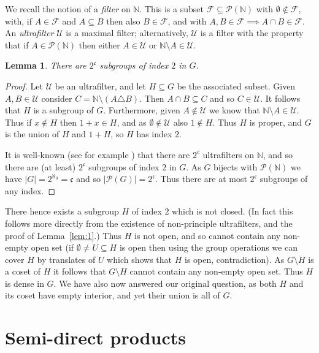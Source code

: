 \documentclass[twoside,a4paper,12pt]{article}
\theoremstyle{plain}
\newtheorem{lemma}[proposition]{Lemma}
\theoremstyle{definition}
\newcommand{\mc}{\mathcal}
\newcommand{\mf}{\mathfrak}
\begin{document}
We recall the notion of a \emph{filter} on $\mathbb N$.  This is a subset $\mc F\subseteq
\mc P(\mathbb N)$ with $\emptyset\not\in\mc F$, with, if $A\in\mc F$ and $A\subseteq B$ then also
$B\in\mc F$, and with $A,B\in\mc F\implies A\cap B\in\mc F$.  An \emph{ultrafilter} $\mc U$
is a maximal filter; alternatively, $\mc U$ is a filter with the property that if
$A\in\mc P(\mathbb N)$ then either $A\in\mc U$ or $\mathbb N\setminus A\in\mc U$.

\begin{lemma}
There are $2^{\mf{c}}$ subgroups of index $2$ in $G$.
\end{lemma}
\begin{proof}
Let $\mc U$ be an ultrafilter, and let $H\subseteq G$ be the associated subset.  Given $A,B\in\mc U$
consider $C=\mathbb N \setminus (A\triangle B)$.  Then $A\cap B \subseteq C$ and so $C\in\mc U$.
It follows that $H$ is a subgroup of $G$.  Furthermore, given $A\not\in\mc U$ we know that
$\mathbb N\setminus A\in\mc U$.  Thus if $x\not\in H$ then $1+x\in H$, and as $\emptyset\not\in
\mc U$ also $1\not\in H$.  Thus $H$ is proper, and $G$ is the union of $H$ and $1+H$, so $H$ has
index $2$.

It is well-known (see for example \cite{a2}) that there are $2^c$ ultrafilters on $\mathbb N$,
and so there are (at least) $2^\mf{c}$ subgroups of index $2$ in $G$.  As $G$ bijects with
$\mc P(\mathbb N)$ we have $|G| = 2^{\aleph_0} = \mf{c}$ and so $|\mc P(G)| = 2^{\mf{c}}$.
Thus there are at most $2^{\mf{c}}$ subgroups of any index.
\end{proof}

There hence exists a subgroup $H$ of index $2$ which is not closed.  (In fact this follows more
directly from the existence of non-principle ultrafilters, and the proof of Lemma~\ref{lem:1}.)
Thus $H$ is not open, and so cannot contain any non-empty open set (if $\emptyset\not=
U\subseteq H$ is open then using the group operations we can cover $H$ by translates of $U$ which
shows that $H$ is open, contradiction).  As $G\setminus H$ is a coset of $H$ it follows that
$G\setminus H$ cannot contain any non-empty open set.  Thus $H$ is dense in $G$.  We have also
now answered our original question, as both $H$ and its coset have empty interior, and yet their
union is all of $G$.



\section{Semi-direct products}
\end{document}
